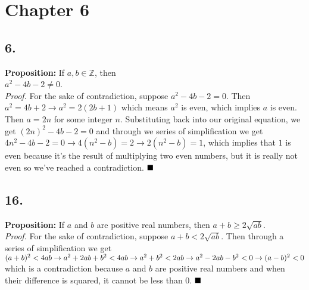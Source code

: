 \documentclass[12pt]{article}
\begin{document}
\begin{minipage}[t]{0.40\textwidth}


\section*{Chapter 6}
\subsection*{6.}
\textbf{Proposition:} If $ a,b\in \mathbb{Z} $, then \\ $ a^2-4b-2\neq0 $.
\\\textit{Proof.} For the sake of contradiction, suppose $ a^2-4b-2=0 $. Then $ a^2=4b+2\rightarrow a^2=2(2b+1) $ which means $ a^2 $ is even, which implies $ a $ is even. Then $ a=2n $ for some integer $ n $. Substituting back into our original equation, we get $ (2n)^2-4b-2=0$ and through we series of simplification we get $ 4n^2-4b-2=0\rightarrow4(n^2-b)=2\rightarrow2(n^2-b)=1$, which implies that $ 1 $ is even because it's the result of multiplying two even numbers, but it is really not even so we've reached a contradiction.
$ \hfill\blacksquare $ 
\subsection*{16.}
\textbf{Proposition:} If $ a $ and $ b $ are positive real numbers, then $ a+b\geq 2\sqrt{ab} $.
\\\textit{Proof.} For the sake of contradiction, suppose $ a+b< 2\sqrt{ab} $. Then through a series of simplification we get \\$ (a+b)^2< 4ab \\\rightarrow a^2+2ab+b^2< 4ab \\\rightarrow a^2+b^2<2ab\\\rightarrow a^2-2ab-b^2<0\\\rightarrow (a-b)^2<0$ which is a contradiction because $ a $ and $ b $ are positive real numbers and when their difference is squared, it cannot be less than 0.
$ \hfill\blacksquare $ 





\end{minipage}
\hfill\vline\hfill
\end{document}
